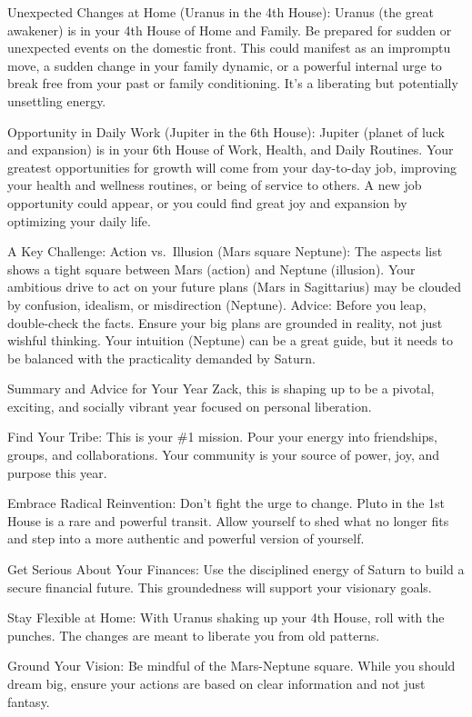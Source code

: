 \documentclass{article}
\begin{document}
Unexpected Changes at Home (Uranus in the 4th House): Uranus (the great
awakener) is in your 4th House of Home and Family. Be prepared for
sudden or unexpected events on the domestic front. This could manifest
as an impromptu move, a sudden change in your family dynamic, or a
powerful internal urge to break free from your past or family
conditioning. It's a liberating but potentially unsettling energy.

Opportunity in Daily Work (Jupiter in the 6th House): Jupiter (planet of
luck and expansion) is in your 6th House of Work, Health, and Daily
Routines. Your greatest opportunities for growth will come from your
day-to-day job, improving your health and wellness routines, or being of
service to others. A new job opportunity could appear, or you could find
great joy and expansion by optimizing your daily life.

A Key Challenge: Action vs.~Illusion (Mars square Neptune): The aspects
list shows a tight square between Mars (action) and Neptune (illusion).
Your ambitious drive to act on your future plans (Mars in Sagittarius)
may be clouded by confusion, idealism, or misdirection (Neptune).
Advice: Before you leap, double-check the facts. Ensure your big plans
are grounded in reality, not just wishful thinking. Your intuition
(Neptune) can be a great guide, but it needs to be balanced with the
practicality demanded by Saturn.

Summary and Advice for Your Year Zack, this is shaping up to be a
pivotal, exciting, and socially vibrant year focused on personal
liberation.

Find Your Tribe: This is your \#1 mission. Pour your energy into
friendships, groups, and collaborations. Your community is your source
of power, joy, and purpose this year.

Embrace Radical Reinvention: Don't fight the urge to change. Pluto in
the 1st House is a rare and powerful transit. Allow yourself to shed
what no longer fits and step into a more authentic and powerful version
of yourself.

Get Serious About Your Finances: Use the disciplined energy of Saturn to
build a secure financial future. This groundedness will support your
visionary goals.

Stay Flexible at Home: With Uranus shaking up your 4th House, roll with
the punches. The changes are meant to liberate you from old patterns.

Ground Your Vision: Be mindful of the Mars-Neptune square. While you
should dream big, ensure your actions are based on clear information and
not just fantasy.
\end{document}
